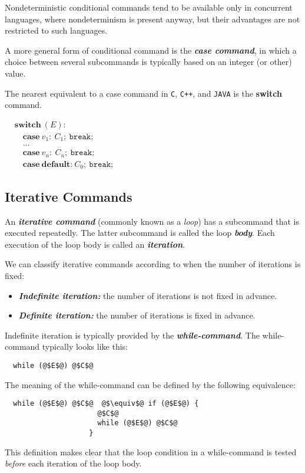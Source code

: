 Nondeterministic conditional commands tend to be available only in concurrent languages, where nondeterminism is present anyway, but their advantages are not restricted to such languages.

A more general form of conditional command is the \textit{\textbf{case command}}, in which a choice between several subcommands is typically based on an integer (or other) value.

The nearest equivalent to a case command in \texttt{C}, \texttt{C++}, and \texttt{JAVA} is the \textbf{switch} command.

$\begin{aligned}
  &\textbf{switch}\ (E):\\
  &\quad \textbf{case}\ v_1:\ C_1;\ \texttt{break};\\
  &\quad...\\
  &\quad \textbf{case}\ v_n:\ C_n;\ \texttt{break};\\
  &\quad \textbf{case}\ \textbf{default:}\ C_0;\ \texttt{break};
\end{aligned}$

\subsection{Iterative Commands}
\label{sec:iter-com}

An \textit{\textbf{iterative command}} (commonly known as a \textit{loop}) has a subcommand that is executed repeatedly. The latter subcommand is called the loop \textit{\textbf{body}}. Each execution of the loop body is called an \textit{\textbf{iteration}}.

We can classify iterative commands according to when the number of iterations is fixed:

\begin{itemize}
  \item \textit{\textbf{Indefinite iteration:}} the number of iterations is not fixed in advance.
  \item \textit{\textbf{Definite iteration:}} the number of iterations is fixed in advance.
\end{itemize}

Indefinite iteration is typically provided by the \textit{\textbf{while-command}}. The while-command typically looks like this:

\begin{verbatim}
  while (@$E$@) @$C$@  
\end{verbatim}
The meaning of the while-command can be defined by the following equivalence:
\begin{verbatim}
  while (@$E$@) @$C$@  @$\equiv$@ if (@$E$@) {
                      @$C$@
                      while (@$E$@) @$C$@
                    }
\end{verbatim}
This definition makes clear that the loop condition in a while-command is tested \textit{before} each iteration of the loop body.

